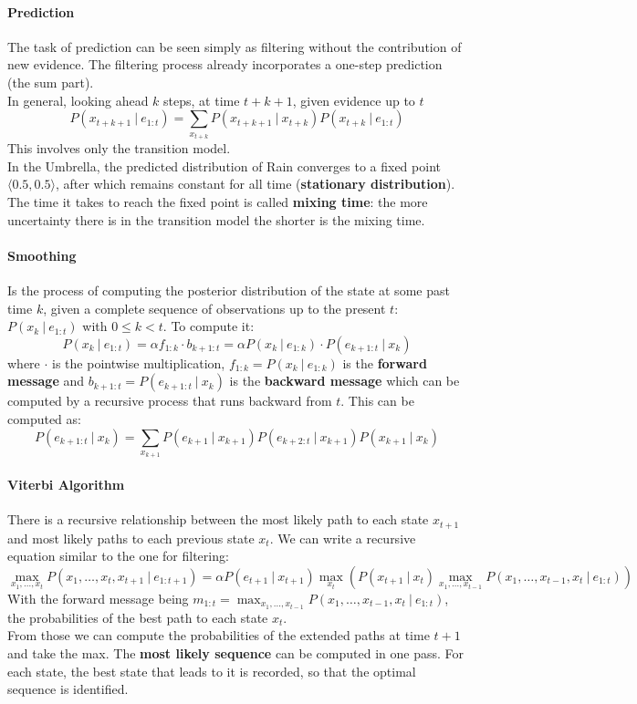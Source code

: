 \documentclass[10pt]{report}
\begin{document}
\paragraph{Prediction} The task of prediction can be seen simply as filtering without the contribution of new evidence. The filtering process already incorporates a one-step prediction (the sum part).\\
In general, looking ahead $k$ steps, at time $t+k+1$, given evidence up to $t$ $$P(x_{t+k+1}\:|\:e_{1:t})=\sum_{x_{t+k}} P(x_{t+k+1}\:|\:x_{t+k})P(x_{t+k}\:|\:e_{1:t})$$
This involves only the transition model.\\
In the Umbrella, the predicted distribution of Rain converges to a fixed point $\langle 0.5,0.5\rangle$, after which remains constant for all time (\textbf{stationary distribution}). The time it takes to reach the fixed point is called \textbf{mixing time}: the more uncertainty there is in the transition model the shorter is the mixing time.
\paragraph{Smoothing} Is the process of computing the posterior distribution of the state at some past time $k$, given a complete sequence of observations up to the present $t$: $P(x_k\:|\:e_{1:t})$ with $0\leq k< t$. To compute it:
$$P(x_k\:|\:e_{1:t}) = \alpha f_{1:k}\cdot b_{k+1:t} = \alpha  P(x_k\:|\:e_{1:k}) \cdot P(e_{k+1:t}\:|\:x_k)$$ where $\cdot$ is the pointwise multiplication, $f_{1:k} = P(x_k\:|\:e_{1:k})$ is the \textbf{forward message} and $b_{k+1:t} = P(e_{k+1:t}\:|\:x_k)$ is the \textbf{backward message} which can be computed by a recursive process that runs backward from $t$. This can be computed as: $$P(e_{k+1:t}\:|\:x_k) = \sum_{x_{k+1}} P(e_{k+1}\:|\:x_{k+1})P(e_{k+2:t}\:|\:x_{k+1})P(x_{k+1}\:|\:x_k)$$
\paragraph{Viterbi Algorithm}
There is a recursive relationship between the most likely path to each state $x_{t+1}$ and most likely paths to each previous state $x_t$. We can write a recursive equation similar to the one for filtering: $$\max_{x_1,\ldots,x_t} P(x_1,\ldots,x_t,x_{t+1}\:|\:e_{1:t+1}) = \alpha P(e_{t+1}\:|\:x_{t+1})\max_{x_t}(P(x_{t+1}\:|\:x_t) \max_{x_1,\ldots,x_{t-1}} P(x_1,\ldots,x_{t-1},x_t\:|\:e_{1:t}))$$
With the forward message being $m_{1:t} = \max_{x_1,\ldots,x_{t-1}} P(x_1,\ldots,x_{t-1},x_t\:|\:e_{1:t})$, the probabilities of the best path to each state $x_t$.\\From those we can compute the probabilities of the extended paths at time $t+1$ and take the max. The \textbf{most likely sequence} can be computed in one pass. For each state, the best state that leads to it is recorded, so that the optimal sequence is identified.
\end{document}
